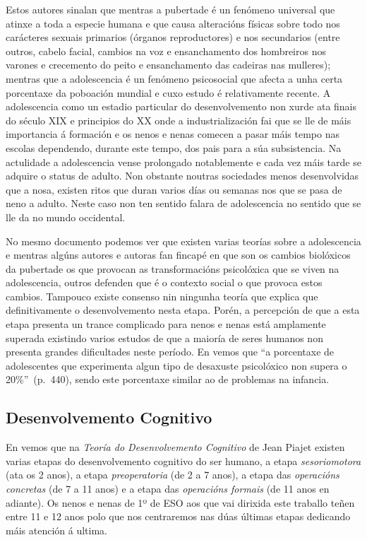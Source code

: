 Estos autores sinalan que mentras a pubertade é un fenómeno universal que atinxe a toda a especie humana e que causa alteracións físicas sobre todo nos carácteres sexuais primarios (órganos reproductores) e nos secundarios (entre outros, cabelo facial, cambios na voz e ensanchamento dos hombreiros nos varones e crecemento do peito e ensanchamento das cadeiras nas mulleres); mentras que a adolescencia é un fenómeno psicosocial que afecta a unha certa porcentaxe da poboación mundial e cuxo estudo é relativamente recente. A adolescencia como un estadio particular do desenvolvemento non xurde ata finais do século XIX e principios do XX onde a industrialización fai que se lle de máis importancia á formación e os nenos e nenas comecen a pasar máis tempo nas escolas dependendo, durante este tempo, dos pais para a súa subsistencia. Na actulidade a adolescencia vense prolongado notablemente e cada vez máis tarde se adquire o status de adulto. Non obstante noutras sociedades menos desenvolvidas que a nosa, existen ritos que duran varios días ou semanas nos que se pasa de neno a adulto. Neste caso non ten sentido falara de adolescencia no sentido que se lle da no mundo occidental.

No mesmo documento podemos ver que existen varias teorías sobre a adolescencia e mentras algúns autores e autoras fan fincapé en que son os cambios biolóxicos da pubertade os que provocan as transformacións psicolóxica que se viven na adolescencia, outros defenden que é o contexto social o que provoca estos cambios. Tampouco existe consenso nin ningunha teoría que explica que definitivamente o desenvolvemento nesta etapa. Porén, a percepción de que a esta etapa presenta un trance complicado para nenos e nenas está amplamente superada existindo varios estudos de que a maioría de seres humanos non presenta grandes dificultades neste período. En  vemos que ``a porcentaxe de adolescentes que experimenta algun tipo de desaxuste psicolóxico non supera o 20\%''~(p.~440), sendo este porcentaxe similar ao de problemas na infancia.

\subsection{Desenvolvemento Cognitivo}
En  vemos que na \emph{Teoría do Desenvolvemento Cognitivo} de Jean Piajet existen varias etapas do desenvolvemento cognitivo do ser humano, a etapa \emph{sesoriomotora} (ata os 2 anos), a etapa \emph{preoperatoria} (de 2 a 7 anos), a etapa das \emph{operacións concretas} (de 7 a 11 anos) e a etapa das \emph{operacións formais} (de 11 anos en adiante). Os nenos e nenas de 1º de ESO aos que vai dirixida este traballo teñen entre 11 e 12 anos polo que nos centraremos nas dúas últimas etapas dedicando máis atención á ultima.

